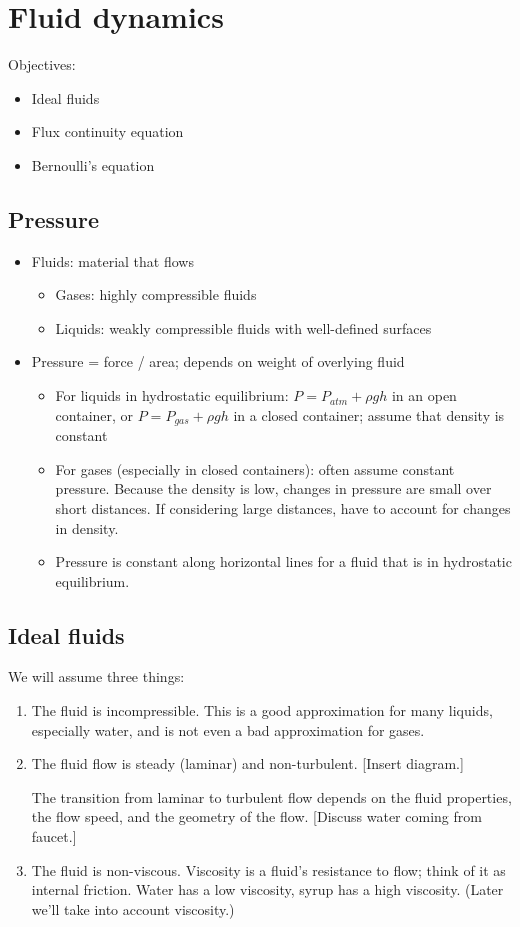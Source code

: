 \section{Fluid dynamics}
Objectives:
\begin{itemize}
\item Ideal fluids
\item Flux continuity equation
\item Bernoulli's equation
\end{itemize}

\subsection{Pressure}
\begin{itemize}
\item Fluids: material that flows
\begin{itemize}
  \item Gases: highly compressible fluids
  \item Liquids: weakly compressible fluids with well-defined surfaces
\end{itemize}
\item Pressure = force / area; depends on weight of overlying fluid
  \begin{itemize}
  \item For liquids in hydrostatic equilibrium: $P=P_{atm}+\rho gh$ in an open container, or $P=P_{gas}+\rho gh$ in a closed container; assume that density is constant
  \item For gases (especially in closed containers): often assume constant pressure. Because the density is low, changes in pressure are small over short distances. If considering large distances, have to account for changes in density.  
  \item Pressure is constant along horizontal lines for a fluid that is in hydrostatic equilibrium.
  \end{itemize}
\end{itemize}

\subsection{Ideal fluids}
We will assume three things:
\begin{enumerate}
\item The fluid is incompressible. This is a good approximation for many liquids, especially water, and is not even a bad approximation for gases.
\item The fluid flow is steady (laminar) and non-turbulent.
  [Insert diagram.]
  \vspace{3cm}
  
The transition from laminar to turbulent flow depends on the fluid properties, the flow speed, and the geometry of the flow. [Discuss water coming from faucet.]
\item The fluid is non-viscous. Viscosity is a fluid's resistance to flow; think of it as internal friction. Water has a low viscosity, syrup has a high viscosity. (Later we'll take into account viscosity.)
\end{enumerate}

